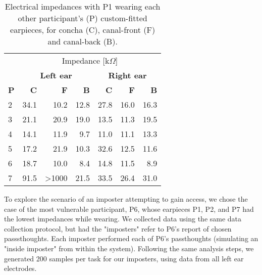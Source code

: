 \documentclass{sigchi}
\begin{document}
\begin{table}[h]
\begin{center}
\begin{tabular}{lrrrrrr}
& \multicolumn{6}{c}{Impedance [k\(\Omega\)]} \\
\cline{2-7}
& \multicolumn{3}{|c|}{\textbf{Left ear}} & \multicolumn{3}{c|}{\textbf{Right ear}} \\
\textbf{P} & \textbf{C} & \textbf{F} & \textbf{B} & \textbf{C} & \textbf{F} & \textbf{B} \\
\hline
2 & 34.1 & 10.2 & 12.8 & 27.8 & 16.0 & 16.3\\
3 & 21.1 & 20.9 & 19.0 & 13.5 & 11.3 & 19.5\\
4 & 14.1 & 11.9 & 9.7 & 11.0 & 11.1 & 13.3\\
5 & 17.2 & 21.9 & 10.3 & 32.6 & 12.5 & 11.6\\
6 & 18.7 & 10.0 & 8.4 & 14.8 & 11.5 & 8.9\\
7 & 91.5 & \textgreater1000 & 21.5 & 33.5 & 26.4 & 31.0\\
\end{tabular}
\end{center}
\caption{Electrical impedances with P1 wearing each other participant's (P) custom-fitted earpieces, for concha (C), canal-front (F) and canal-back (B).}
\label{tab:p1_imposter_impedances}
\end{table}

To explore the scenario of an imposter attempting to gain access, we chose the case of the most vulnerable participant, P6, whose earpieces P1, P2, and P7 had the lowest impedances while wearing. We collected data using the same data collection protocol, but had the "imposters" refer to P6's report of chosen passsthoughts.
Each imposter performed each of P6's passthoughts (simulating an "inside imposter" from within the system). Following the same analysis steps, we generated 200 samples per task for our imposters, using data from all left ear electrodes.

\end{document}
